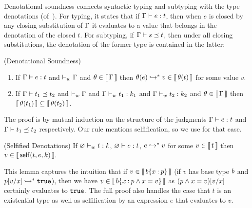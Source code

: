 Denotational soundness connects syntactic typing and subtyping 
with the type denotations (of~).
For typing, it states that if
$\hastype{\tcenv}{e}{t}$,
then when $e$ is closed by any closing substitution of $\tcenv$
it evaluates to a value that belongs in the denotation of the closed $t$.
For subtyping,
if $\isSubType{\tcenv}{s}{t}$, then
under all closing substitutions, the denotation of the
former type is contained in the latter:

\begin{theorem}\label{lem:denote-sound-first}
\label{denote-sound} (Denotational Soundness)
\begin{enumerate}
\item If $\hastype{\tcenv}{e}{t}$
      and $\isWellFormedE{\tcenv}$
      and $\theta \in \denote{\tcenv}$
      then $\evalsTo{\theta(e)}{v} \in \denote{\theta(t)}$ for some value $v$.
\item If $\isSubType{\tcenv}{t_1}{t_2}$
      and $\isWellFormedE{\tcenv}$
      and $\isWellFormed{\tcenv}{t_1}{k_1}$
      and $\isWellFormed{\tcenv}{t_2}{k_2}$ and $\theta \in \denote{\tcenv}$ then $\denote{\theta(t_1)} \subseteq\denote{\theta(t_2)}$.
\end{enumerate}
\end{theorem}

The proof is by mutual induction
on the structure of the judgments
$\hastype{\tcenv}{e}{t}$ and
$\isSubType{\tcenv}{t_1}{t_2}$ respectively.
%
Our rule \tVar mentions selfification,
so we use 
for that case.

\begin{lemma}\label{denote-selfification} (Selfified Denotations)
    If $\isWellFormed{\varnothing}{\stype}{\skind}$,
       $\hastype{\varnothing}{\sexpr}{\stype}$,
       $\evalsTo{\sexpr}{\sval}$ for some $\sval \in \denote{\stype}$
    then $\sval \in \denote{\self{t}{e}{k}}$.
\end{lemma}

This lemma captures the intuition
that if $v \in \denote{\breft{\sbase}{x}{p}}$
(\ie if $v$ has base type $\sbase$
and $\evalsTo{\subst{p}{x}{v}}{\ttrue}$),
then we have $v \in \denote{\breft{\sbase}{x}{ p \wedge x = v}}$
as $\subst{(p \wedge x=v)}{x}{v}$ certainly evaluates to $\ttrue$.
%
The full proof also handles the case that $t$
is an existential type as well as selfification
by an expression $e$ that evaluates to $v$.




